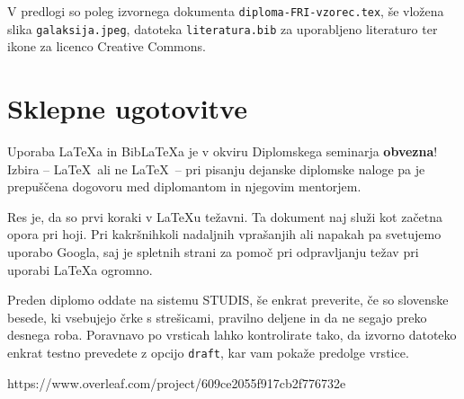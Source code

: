 \documentclass[a4paper,12pt,openright]{book}
\newcommand{\BibLaTeX}{{\sc Bib}\LaTeX}
\begin{document}
V predlogi so poleg izvornega  dokumenta \texttt{diploma-FRI-vzorec.tex}, še vložena slika \texttt{galaksija.jpeg}, datoteka \texttt{literatura.bib} za uporabljeno literaturo  ter
ikone za licenco Creative Commons.


\chapter{Sklepne ugotovitve}

Uporaba \LaTeX{a} in \BibLaTeX{a} je v okviru Diplomskega seminarja \textbf{obvezna}!
Izbira -- \LaTeX\ ali ne \LaTeX\ -- pri pisanju dejanske diplomske naloge pa je pre\-pu\-šče\-na dogovoru med diplomantom in njegovim mentorjem.

Res je, da so prvi koraki v \LaTeX{}u težavni.
Ta dokument naj služi kot začetna opora pri hoji.
Pri kakršnihkoli nadaljnih vprašanjih ali napakah pa svetujemo uporabo Googla, saj je spletnih strani za pomoč pri odpravljanju težav pri uporabi \LaTeX{}a ogromno.

Preden diplomo oddate na sistemu STUDIS, še enkrat preverite, če so slovenske besede, ki vsebujejo črke s strešicami,  pravilno deljene in da ne segajo preko desnega roba.
Poravnavo po vrsticah lahko kontrolirate tako, da izvorno datoteko enkrat testno prevedete z opcijo \texttt{draft}, kar vam pokaže  predolge vrstice.






\printbibliography[heading=bibintoc,type=article,title={Članki v revijah}]
https://www.overleaf.com/project/609ce2055f917cb2f776732e
\printbibliography[heading=bibintoc,type=inproceedings,title={Članki v zbornikih}]

\printbibliography[heading=bibintoc,type=incollection,title={Poglavja v knjigah}]

\printbibliography[heading=bibintoc,title={Celotna literatura}]
\end{document}
